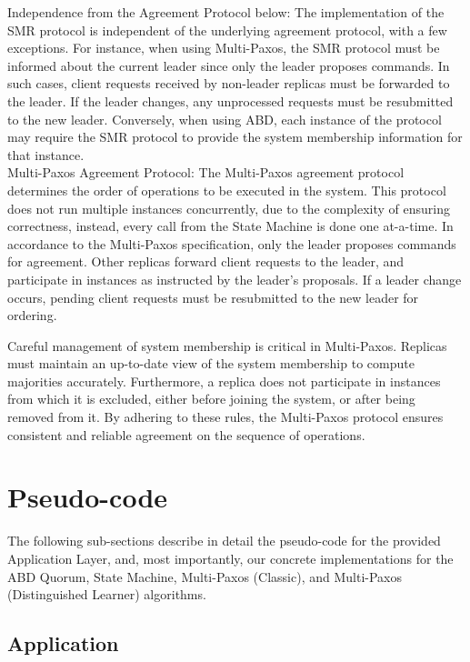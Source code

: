 \documentclass[sigconf]{acmart}
\begin{document}
Independence from the Agreement Protocol below: The implementation of the SMR protocol is independent of the underlying agreement protocol, with a few exceptions. For instance, when using Multi-Paxos, the SMR protocol must be informed about the current leader since only the leader proposes commands. In such cases, client requests received by non-leader replicas must be forwarded to the leader. If the leader changes, any unprocessed requests must be resubmitted to the new leader. Conversely, when using ABD, each instance of the protocol may require the SMR protocol to provide the system membership information for that instance. \\

Multi-Paxos Agreement Protocol: The Multi-Paxos agreement protocol determines the order of operations to be executed in the system. This protocol does not run multiple instances concurrently, due to the complexity of ensuring correctness, instead, every call from the State Machine is done one at-a-time. In accordance to the Multi-Paxos specification, only the leader proposes commands for agreement. Other replicas forward client requests to the leader, and participate in instances as instructed by the leader’s proposals. If a leader change occurs, pending client requests must be resubmitted to the new leader for ordering.

Careful management of system membership is critical in Multi-Paxos. Replicas must maintain an up-to-date view of the system membership to compute majorities accurately. Furthermore, a replica does not participate in instances from which it is excluded, either before joining the system, or after being removed from it. By adhering to these rules, the Multi-Paxos protocol ensures consistent and reliable agreement on the sequence of operations. \\

\section{Pseudo-code}

The following sub-sections describe in detail the pseudo-code for the provided Application Layer, and, most importantly, our concrete implementations for the ABD Quorum, State Machine, Multi-Paxos (Classic), and Multi-Paxos (Distinguished Learner) algorithms.

\subsection{Application}
\end{document}
